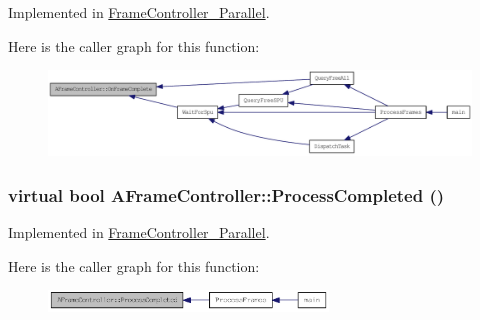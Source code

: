 Implemented in \hyperlink{class_frame_controller___parallel_a26429e70ddf3aa68cc2d28000a4935e1}{FrameController\_\-Parallel}.



Here is the caller graph for this function:\nopagebreak
\begin{figure}[H]
\begin{center}
\leavevmode
\includegraphics[width=378pt]{class_a_frame_controller_afd4834463eebfc33536fed009bfb966c_icgraph}
\end{center}
\end{figure}


\hypertarget{class_a_frame_controller_a92ba4b7f8c0c84fff8be7203fae5221d}{
\subsubsection[{ProcessCompleted}]{\setlength{\rightskip}{0pt plus 5cm}virtual bool AFrameController::ProcessCompleted ()}}
\label{class_a_frame_controller_a92ba4b7f8c0c84fff8be7203fae5221d}


Implemented in \hyperlink{class_frame_controller___parallel_ac778eb523c6725a9e4da4e4239a88b2a}{FrameController\_\-Parallel}.



Here is the caller graph for this function:\nopagebreak
\begin{figure}[H]
\begin{center}
\leavevmode
\includegraphics[width=211pt]{class_a_frame_controller_a92ba4b7f8c0c84fff8be7203fae5221d_icgraph}
\end{center}
\end{figure}




